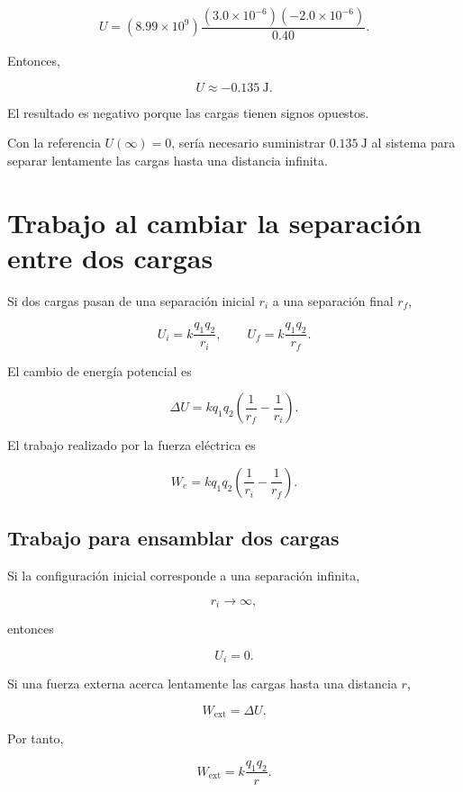 \[
U
=
(8.99\times10^9)
\frac{(3.0\times10^{-6})(-2.0\times10^{-6})}{0.40}.
\]

Entonces,

\[
\boxed{U\approx-\SI{0.135}{\joule}}.
\]

El resultado es negativo porque las cargas tienen signos opuestos.

Con la referencia \(U(\infty)=0\), sería necesario suministrar
\(\SI{0.135}{\joule}\) al sistema para separar lentamente las cargas hasta una
distancia infinita.


\section{Trabajo al cambiar la separación entre dos cargas}

Si dos cargas pasan de una separación inicial \(r_i\) a una separación final \(r_f\),

\[
U_i=k\frac{q_1q_2}{r_i},
\qquad
U_f=k\frac{q_1q_2}{r_f}.
\]

El cambio de energía potencial es

\begin{equation}
\boxed{
\Delta U
=
kq_1q_2
\left(
\frac{1}{r_f}
-
\frac{1}{r_i}
\right)
}.
\label{eq:deltaU_dos_cargas}
\end{equation}

El trabajo realizado por la fuerza eléctrica es

\begin{equation}
\boxed{
W_e
=
kq_1q_2
\left(
\frac{1}{r_i}
-
\frac{1}{r_f}
\right)
}.
\label{eq:trabajo_dos_cargas}
\end{equation}


\subsection{Trabajo para ensamblar dos cargas}

Si la configuración inicial corresponde a una separación infinita,

\[
r_i\to\infty,
\]

entonces

\[
U_i=0.
\]

Si una fuerza externa acerca lentamente las cargas hasta una distancia \(r\),

\[
W_{\text{ext}}=\Delta U.
\]

Por tanto,

\begin{equation}
\boxed{
W_{\text{ext}}
=
k\frac{q_1q_2}{r}
}.
\label{eq:trabajo_ensamblaje_dos_cargas}
\end{equation}

